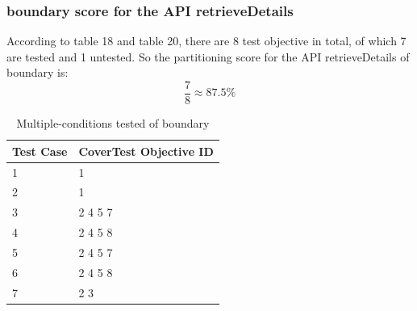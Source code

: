 \documentclass{article}
\begin{document}
\subsubsection{boundary score for the API retrieveDetails}
According to table 18 and table 20, there are 8 test objective in total, of which 7 are tested and 1 untested. So the partitioning score for the API retrieveDetails of boundary is:
$$\frac{7}{8}\approx87.5\%$$
\begin{longtable}{|p{2cm}|p{8cm}|}
\caption{Multiple-conditions tested of boundary}\\
\hline 
Test Case& CoverTest Objective ID\\
\hline  
1&1\\
\hline
2&1\\
\hline
3&2 4 5 7\\
\hline
4&2 4 5 8\\
\hline
5&2 4 5 7\\
\hline
6&2 4 5 8\\
\hline
7&2 3\\
\hline
\end{longtable}
\end{document}
